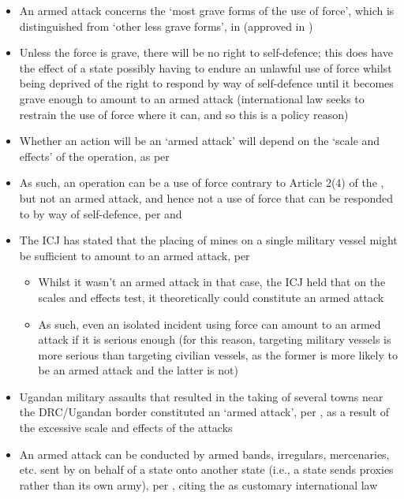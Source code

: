 \begin{itemize}
    \item An armed attack concerns the `most grave forms of the use of force', which is distinguished from `other less grave forms', in  (approved in )
    \item Unless the force is grave, there will be no right to self-defence; this does have the effect of a state possibly having to endure an unlawful use of force whilst being deprived of the right to respond by way of self-defence until it becomes grave enough to amount to an armed attack (international law seeks to restrain the use of force where it can, and so this is a policy reason)
    \item Whether an action will be an `armed attack' will depend on the `scale and effects' of the operation, as per 
    \item As such, an operation can be a use of force contrary to Article 2(4) of the , but not an armed attack, and hence not a use of force that can be responded to by way of self-defence, per  and 
    \item The ICJ has stated that the placing of mines on a single military vessel might be sufficient to amount to an armed attack, per 
    \begin{itemize}
        \item Whilst it wasn't an armed attack in that case, the ICJ held that on the scales and effects test, it theoretically could constitute an armed attack
        \item As such, even an isolated incident using force can amount to an armed attack if it is serious enough (for this reason, targeting military vessels is more serious than targeting civilian vessels, as the former is more likely to be an armed attack and the latter is not)
    \end{itemize}
    \item Ugandan military assaults that resulted in the taking of several towns near the DRC/Ugandan border constituted an `armed attack', per , as a result of the excessive scale and effects of the attacks
    \item An armed attack can be conducted by armed bands, irregulars, mercenaries, etc. sent by on behalf of a state onto another state (i.e., a state sends proxies rather than its own army), per , citing the  as customary international law

\end{itemize}
